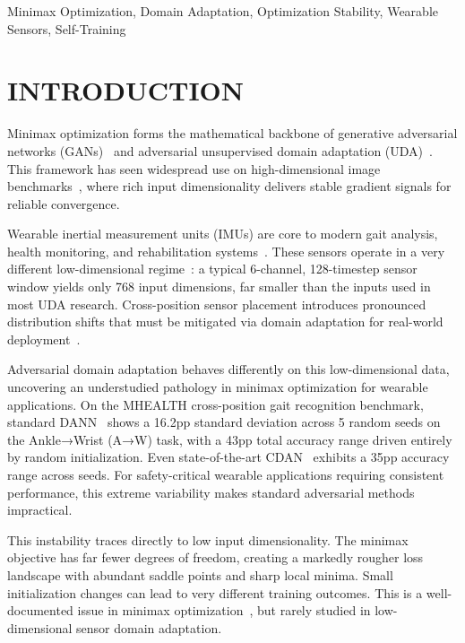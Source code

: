 \documentclass[conference]{IEEEtran}
\begin{document}
\begin{IEEEkeywords}
Minimax Optimization, Domain Adaptation, Optimization Stability, Wearable Sensors, Self-Training
\end{IEEEkeywords}

\section{INTRODUCTION}
\label{sec:intro}

Minimax optimization forms the mathematical backbone of generative adversarial networks (GANs)~\cite{goodfellow2014generative} and adversarial unsupervised domain adaptation (UDA)~\cite{ganin2016domain}. This framework has seen widespread use on high-dimensional image benchmarks~\cite{long2018conditional,sun2016deep}, where rich input dimensionality delivers stable gradient signals for reliable convergence.

Wearable inertial measurement units (IMUs) are core to modern gait analysis, health monitoring, and rehabilitation systems~\cite{ZhangH01,ZhangH02,ZhangH10}. These sensors operate in a very different low-dimensional regime~\cite{banos2014mhealthdroid,chen2016distilling,ngo2014largest}: a typical 6-channel, 128-timestep sensor window yields only 768 input dimensions, far smaller than the inputs used in most UDA research. Cross-position sensor placement introduces pronounced distribution shifts that must be mitigated via domain adaptation for real-world deployment~\cite{ZhangH01}.

Adversarial domain adaptation behaves differently on this low-dimensional data, uncovering an understudied pathology in minimax optimization for wearable applications. On the MHEALTH cross-position gait recognition benchmark, standard DANN~\cite{ganin2016domain} shows a 16.2pp standard deviation across 5 random seeds on the Ankle→Wrist (A→W) task, with a 43pp total accuracy range driven entirely by random initialization. Even state-of-the-art CDAN~\cite{long2018conditional} exhibits a 35pp accuracy range across seeds. For safety-critical wearable applications requiring consistent performance, this extreme variability makes standard adversarial methods impractical.

This instability traces directly to low input dimensionality. The minimax objective has far fewer degrees of freedom, creating a markedly rougher loss landscape with abundant saddle points and sharp local minima. Small initialization changes can lead to very different training outcomes. This is a well-documented issue in minimax optimization~\cite{daskalakis2018training}, but rarely studied in low-dimensional sensor domain adaptation.
\end{document}
